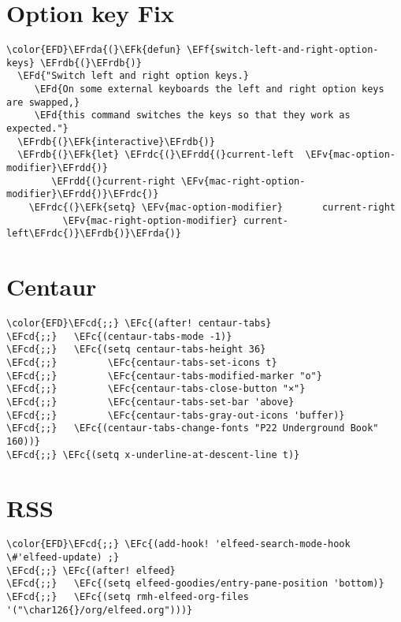\documentclass[12pt]{article}
\theoremstyle{plain}%
\theoremstyle{definition}
\theoremstyle{remark}
\newcommand{\EFc}[1]{\textcolor{EFc}{#1}} %
\newcommand{\EFcd}[1]{\textcolor{EFcd}{#1}} %
\newcommand{\EFd}[1]{\textcolor{EFd}{#1}} %
\newcommand{\EFk}[1]{\textcolor{EFk}{#1}} %
\newcommand{\EFf}[1]{\textcolor{EFf}{#1}} %
\newcommand{\EFv}[1]{\textcolor{EFv}{#1}} %
\newcommand{\EFrda}[1]{\textcolor{EFrda}{#1}} %
\newcommand{\EFrdb}[1]{\textcolor{EFrdb}{#1}} %
\newcommand{\EFrdc}[1]{\textcolor{EFrdc}{#1}} %
\newcommand{\EFrdd}[1]{\textcolor{EFrdd}{#1}} %
\begin{document}
\section{Option key Fix}
\label{sec:org13ae964}
\begin{Code}
\begin{Verbatim}
\color{EFD}\EFrda{(}\EFk{defun} \EFf{switch-left-and-right-option-keys} \EFrdb{(}\EFrdb{)}
  \EFd{"Switch left and right option keys.}
     \EFd{On some external keyboards the left and right option keys are swapped,}
     \EFd{this command switches the keys so that they work as expected."}
  \EFrdb{(}\EFk{interactive}\EFrdb{)}
  \EFrdb{(}\EFk{let} \EFrdc{(}\EFrdd{(}current-left  \EFv{mac-option-modifier}\EFrdd{)}
        \EFrdd{(}current-right \EFv{mac-right-option-modifier}\EFrdd{)}\EFrdc{)}
    \EFrdc{(}\EFk{setq} \EFv{mac-option-modifier}       current-right
          \EFv{mac-right-option-modifier} current-left\EFrdc{)}\EFrdb{)}\EFrda{)}
\end{Verbatim}
\end{Code}
\section{Centaur}
\label{sec:orgb107f82}
\begin{Code}
\begin{Verbatim}
\color{EFD}\EFcd{;;} \EFc{(after! centaur-tabs}
\EFcd{;;}   \EFc{(centaur-tabs-mode -1)}
\EFcd{;;}   \EFc{(setq centaur-tabs-height 36}
\EFcd{;;}         \EFc{centaur-tabs-set-icons t}
\EFcd{;;}         \EFc{centaur-tabs-modified-marker "o"}
\EFcd{;;}         \EFc{centaur-tabs-close-button "×"}
\EFcd{;;}         \EFc{centaur-tabs-set-bar 'above}
\EFcd{;;}         \EFc{centaur-tabs-gray-out-icons 'buffer)}
\EFcd{;;}   \EFc{(centaur-tabs-change-fonts "P22 Underground Book" 160))}
\EFcd{;;} \EFc{(setq x-underline-at-descent-line t)}
\end{Verbatim}
\end{Code}
\section{RSS}
\label{sec:orgdf710e6}
\begin{Code}
\begin{Verbatim}
\color{EFD}\EFcd{;;} \EFc{(add-hook! 'elfeed-search-mode-hook \#'elfeed-update) ;}
\EFcd{;;} \EFc{(after! elfeed}
\EFcd{;;}   \EFc{(setq elfeed-goodies/entry-pane-position 'bottom)}
\EFcd{;;}   \EFc{(setq rmh-elfeed-org-files '("\char126{}/org/elfeed.org")))}
\end{Verbatim}
\end{Code}
\end{document}
